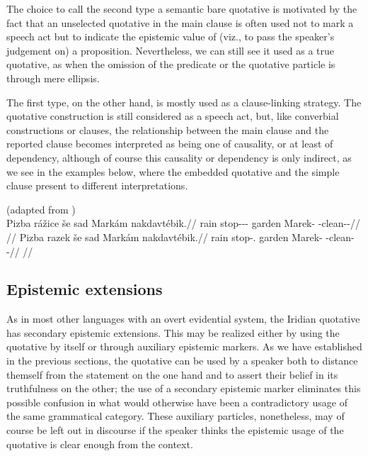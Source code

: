 The choice to call the second type a semantic bare quotative is motivated by the
fact that an unselected quotative in the main clause is often used not to mark a
speech act but to indicate the epistemic value of (viz., to pass the speaker's
judgement on) a proposition. Nevertheless, we can still see it used as a true
quotative, as when the omission of the predicate or the quotative particle is
through mere ellipsis.

The first type, on the other hand, is mostly used as a clause-linking strategy.
The quotative construction is still considered as a speech act, but, like
converbial constructions or  clauses, the relationship between the main
clause and the reported clause becomes interpreted as being one of causality, or
at least of dependency, although of course this causality or dependency is only
indirect, as we see in the examples below, where the embedded quotative and the
simple  clause present to different interpretations.

\pex
  \a(adapted from \cite[3]{tomioka2019})\\
  \begingl
    \gla Pizba rážice še sad Markám nakdavtébik.//
    \glb rain stop-\Av{}-\Pf{}-\Quot{} \Com{} garden Marek-\Agt{} \Incp{}-clean-\Ben{}-\Pf{}//
    \glft {}//
  \endgl
  \a\begingl
    \gla Pizba razek še sad Markám nakdavtébik.//
    \glb rain stop-\Av{}.\Pf{} \Com{} garden Marek-\Agt{} \Incp{}-clean-\Ben{}-\Pf{}//
    \glft {}//
  \endgl
\xe


\subsection{Epistemic extensions}

As in most other languages with an overt evidential system, the Iridian
quotative has secondary epistemic extensions. This may be realized either by
using the quotative by itself or through auxiliary epistemic markers. As we have
established in the previous sections, the quotative can be used by a speaker
both to distance themself from the statement on the one hand and to assert their
belief in its truthfulness on the other; the use of a secondary epistemic marker
eliminates this possible confusion in what would otherwise have been a
contradictory usage of the same grammatical category. These auxiliary particles,
nonetheless, may of course be left out in discourse if the speaker thinks the
epistemic usage of the quotative is clear enough from the context.

